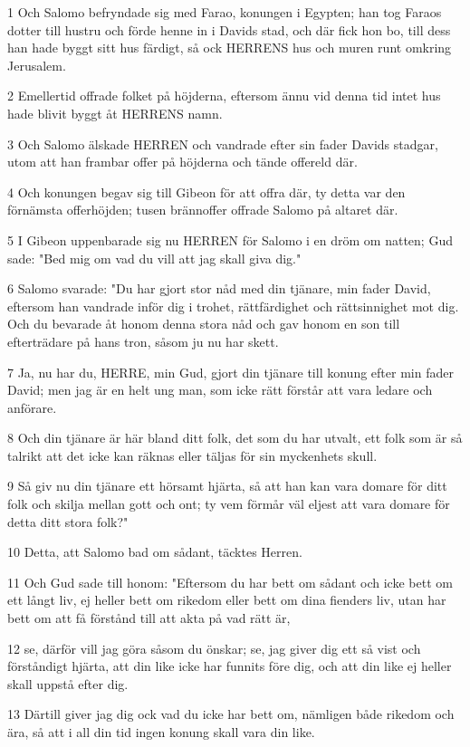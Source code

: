 \par 1 Och Salomo befryndade sig med Farao, konungen i Egypten; han tog Faraos dotter till hustru och förde henne in i Davids stad, och där fick hon bo, till dess han hade byggt sitt hus färdigt, så ock HERRENS hus och muren runt omkring Jerusalem.
\par 2 Emellertid offrade folket på höjderna, eftersom ännu vid denna tid intet hus hade blivit byggt åt HERRENS namn.
\par 3 Och Salomo älskade HERREN och vandrade efter sin fader Davids stadgar, utom att han frambar offer på höjderna och tände offereld där.
\par 4 Och konungen begav sig till Gibeon för att offra där, ty detta var den förnämsta offerhöjden; tusen brännoffer offrade Salomo på altaret där.
\par 5 I Gibeon uppenbarade sig nu HERREN för Salomo i en dröm om natten; Gud sade: "Bed mig om vad du vill att jag skall giva dig."
\par 6 Salomo svarade: "Du har gjort stor nåd med din tjänare, min fader David, eftersom han vandrade inför dig i trohet, rättfärdighet och rättsinnighet mot dig. Och du bevarade åt honom denna stora nåd och gav honom en son till efterträdare på hans tron, såsom ju nu har skett.
\par 7 Ja, nu har du, HERRE, min Gud, gjort din tjänare till konung efter min fader David; men jag är en helt ung man, som icke rätt förstår att vara ledare och anförare.
\par 8 Och din tjänare är här bland ditt folk, det som du har utvalt, ett folk som är så talrikt att det icke kan räknas eller täljas för sin myckenhets skull.
\par 9 Så giv nu din tjänare ett hörsamt hjärta, så att han kan vara domare för ditt folk och skilja mellan gott och ont; ty vem förmår väl eljest att vara domare för detta ditt stora folk?"
\par 10 Detta, att Salomo bad om sådant, täcktes Herren.
\par 11 Och Gud sade till honom: "Eftersom du har bett om sådant och icke bett om ett långt liv, ej heller bett om rikedom eller bett om dina fienders liv, utan har bett om att få förstånd till att akta på vad rätt är,
\par 12 se, därför vill jag göra såsom du önskar; se, jag giver dig ett så vist och förståndigt hjärta, att din like icke har funnits före dig, och att din like ej heller skall uppstå efter dig.
\par 13 Därtill giver jag dig ock vad du icke har bett om, nämligen både rikedom och ära, så att i all din tid ingen konung skall vara din like.
